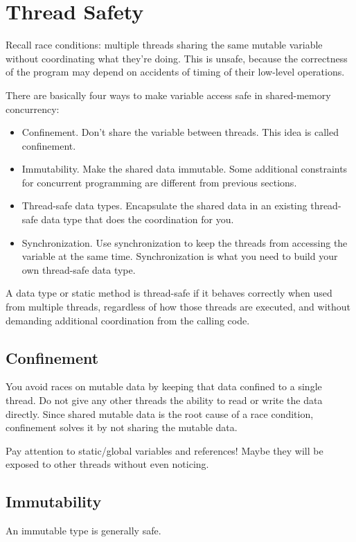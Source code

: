 \documentclass[letterpaper,12pt]{article}
\begin{document}
\section{Thread Safety}
Recall race conditions: multiple threads sharing the same mutable variable without coordinating what they're doing. This is unsafe, because the correctness of the program may depend on accidents of timing of their low-level operations.

There are basically four ways to make variable access safe in shared-memory concurrency:\begin{itemize}
      \item Confinement. Don't share the variable between threads. This idea is called confinement.
      \item Immutability. Make the shared data immutable. Some additional constraints for concurrent programming are different from previous sections.
      \item Thread-safe data types. Encapsulate the shared data in an existing thread-safe data type that does the coordination for you.
      \item Synchronization. Use synchronization to keep the threads from accessing the variable at the same time. Synchronization is what you need to build your own thread-safe data type.
\end{itemize}

A data type or static method is thread-safe if it behaves correctly when used from multiple threads, regardless of how those threads are executed, and without demanding additional coordination from the calling code.

\subsection{Confinement}
You avoid races on mutable data by keeping that data confined to a single thread. Do not give any other threads the ability to read or write the data directly. Since shared mutable data is the root cause of a race condition, confinement solves it by not sharing the mutable data.

Pay attention to static/global variables and references! Maybe they will be exposed to other threads without even noticing.

\subsection{Immutability}
An immutable type is generally safe. 
\end{document}

